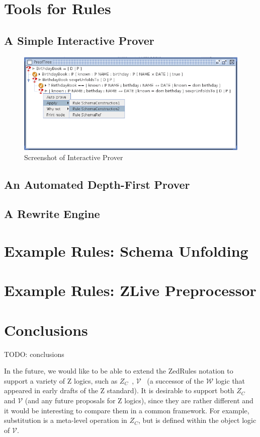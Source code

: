 \documentclass{entcs}
\begin{document}
\section{Tools for Rules}


\subsection{A Simple Interactive Prover}

\begin{figure}[htbp]
  \centering
  \includegraphics[width=\textwidth]{cztprover1}
  \caption{Screenshot of Interactive Prover}
  \label{fig:cztprover}
\end{figure}


\subsection{An Automated Depth-First Prover}

\subsection{A Rewrite Engine}

\section{Example Rules: Schema Unfolding}

\section{Example Rules: ZLive Preprocessor}

\section{Conclusions}


TODO: conclusions


In the future, we would like to be able to extend the ZedRules notation to
support a variety of Z logics, such as
$Z_C$~\cite{henson:revising-z-1-99,henson:revising-z-2-99},
$\mathcal{V}$~\cite{brien:calculus-schemas-z00} (a successor of the
$\mathcal{W}$ logic that appeared in early drafts of the Z standard).  It
is desirable to support both $Z_C$ and $\mathcal{V}$ (and any future
proposals for Z logics), since they are rather different and it would be
interesting to compare them in a common framework.  For example,
substitution is a meta-level operation in $Z_C$, but is defined within the
object logic of $\mathcal{V}$.
\end{document}
